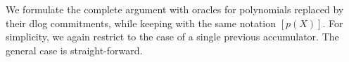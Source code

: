 \documentclass[10pt,article,oneside]{memoir}
\theoremstyle{definition}
\theoremstyle{remark}
\begin{document}

We formulate the complete argument with oracles for polynomials replaced by their dlog commitments, while keeping with the same notation $[p(X)]$.
For simplicity, we again restrict to the case of a single previous accumulator. 
The general case is straight-forward.
\end{document}
